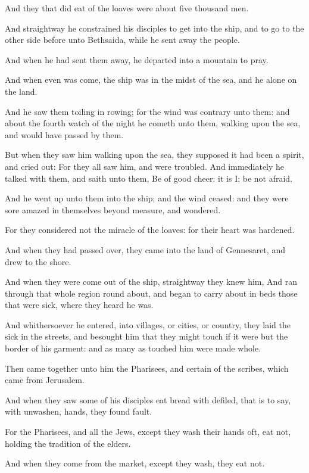 \Verse And they that did eat of the loaves were about five thousand men.

\Verse And straightway he constrained his disciples to get into the ship, and to go to the other side before unto Bethsaida, while he sent away the people.

\Verse And when he had sent them away, he departed into a mountain to pray.

\Verse And when even was come, the ship was in the midst of the sea, and he alone on the land.

\Verse And he saw them toiling in rowing; for the wind was contrary unto them: and about the fourth watch of the night he cometh unto them, walking upon the sea, and would have passed by them.

\Verse But when they saw him walking upon the sea, they supposed it had been a spirit, and cried out: \Verse For they all saw him, and were troubled. And immediately he talked with them, and saith unto them, Be of good cheer: it is I; be not afraid.

\Verse And he went up unto them into the ship; and the wind ceased: and they were sore amazed in themselves beyond measure, and wondered.

\Verse For they considered not the miracle of the loaves: for their heart was hardened.

\Verse And when they had passed over, they came into the land of Gennesaret, and drew to the shore.

\Verse And when they were come out of the ship, straightway they knew him, \Verse And ran through that whole region round about, and began to carry about in beds those that were sick, where they heard he was.

\Verse And whithersoever he entered, into villages, or cities, or country, they laid the sick in the streets, and besought him that they might touch if it were but the border of his garment: and as many as touched him were made whole.


\Chapter
\Verse Then came together unto him the Pharisees, and certain of the scribes, which came from Jerusalem.

\Verse And when they saw some of his disciples eat bread with defiled, that is to say, with unwashen, hands, they found fault.

\Verse For the Pharisees, and all the Jews, except they wash their hands oft, eat not, holding the tradition of the elders.

\Verse And when they come from the market, except they wash, they eat not.

